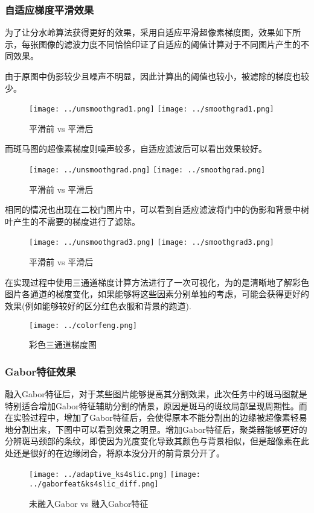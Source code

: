 \documentclass[UTF8]{ctexart}
\begin{document}
\subsubsection{自适应梯度平滑效果}

为了让分水岭算法获得更好的效果，采用自适应平滑超像素梯度图，效果如下所示，每张图像的滤波力度不同恰恰印证了自适应的阈值计算对于不同图片产生的不同效果。

由于原图中伪影较少且噪声不明显，因此计算出的阈值也较小，被滤除的梯度也较少。
\begin{figure}[H]
    \centering
    \texttt{[image: ../umsmoothgrad1.png]}
    \texttt{[image: ../smoothgrad1.png]}
    \caption{平滑前 vs 平滑后}
\end{figure}


而斑马图的超像素梯度则噪声较多，自适应滤波后可以看出效果较好。
\begin{figure}[H]
    \centering
    \texttt{[image: ../unsmoothgrad.png]}
    \texttt{[image: ../smoothgrad.png]}
    \caption{平滑前 vs 平滑后}
\end{figure}

相同的情况也出现在二校门图片中，可以看到自适应滤波将门中的伪影和背景中树叶产生的不需要的梯度进行了滤除。
\begin{figure}[H]
    \centering
    \texttt{[image: ../unsmoothgrad3.png]}
    \texttt{[image: ../smoothgrad3.png]}
    \caption{平滑前 vs 平滑后}
\end{figure}

在实现过程中使用三通道梯度计算方法进行了一次可视化，为的是清晰地了解彩色图片各通道的梯度变化，如果能够将这些因素分别单独的考虑，可能会获得更好的效果(例如能够较好的区分红色衣服和背景的跑道).
\begin{figure}[H]
    \centering
    \texttt{[image: ../colorfeng.png]}
    \caption{彩色三通道梯度图}
\end{figure}

\subsubsection{Gabor特征效果}
融入Gabor特征后，对于某些图片能够提高其分割效果，此次任务中的斑马图就是特别适合增加Gabor特征辅助分割的情景，原因是斑马的斑纹局部呈现周期性。而在实验过程中，增加了Gabor特征后，会使得原本不能分割出的边缘被超像素轻易地分割出来，下图中可以看到效果之明显。增加Gabor特征后，聚类器能够更好的分辨斑马颈部的条纹，即使因为光度变化导致其颜色与背景相似，但是超像素在此处还是很好的在边缘闭合，将原本没分开的前背景分开了。
\begin{figure}[H]
    \centering
    \texttt{[image: ../adaptive\_ks4slic.png]}
    \texttt{[image: ../gaborfeat\&ks4slic\_diff.png]}
    \caption{未融入Gabor vs 融入Gabor特征}
\end{figure}
\end{document}
